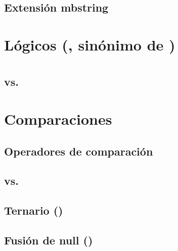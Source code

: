 \documentclass[a4paper,11pt,spanish]{sphinxmanual}
\begin{document}
\subsection{Extensión mbstring}
\label{\detokenize{conceptos-basicos-de-php:extension-mbstring}}

\section{Lógicos (, sinónimo de )}
\label{\detokenize{conceptos-basicos-de-php:logicos-bool-sinonimo-de-boolean}}

\section{}
\label{\detokenize{conceptos-basicos-de-php:null}}

\subsection{ vs. }
\label{\detokenize{conceptos-basicos-de-php:is-null-vs-null}}

\section{Comparaciones}
\label{\detokenize{conceptos-basicos-de-php:comparaciones}}

\subsection{Operadores de comparación}
\label{\detokenize{conceptos-basicos-de-php:operadores-de-comparacion}}

\subsection{\sphinxstyleliteralintitle{==} vs. \sphinxstyleliteralintitle{===}}
\label{\detokenize{conceptos-basicos-de-php:vs}}

\subsection{Ternario ()}
\label{\detokenize{conceptos-basicos-de-php:ternario}}

\subsection{Fusión de null ()}
\label{\detokenize{conceptos-basicos-de-php:fusion-de-null}}
\end{document}
